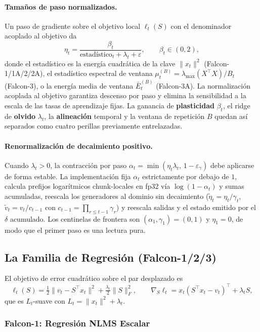 \paragraph{Tamaños de paso normalizados.} Un paso de gradiente sobre el objetivo local $\ell_t(S)$ con el denominador acoplado al objetivo da
\[
\eta_t = \frac{\beta_t}{\text{estadístico}_t + \lambda_t + \varepsilon}, \qquad \beta_t \in (0, 2),
\]
donde el estadístico es la energía cuadrática de la clave $\|x_t\|^2$ (Falcon-1/1A/2/2A), el estadístico espectral de ventana $\mu_t^{(B)} = \lambda_{\max}(X^\top X)/B_t$ (Falcon-3), o la energía media de ventana $\bar{E}_t^{(B)}$ (Falcon-3A). La normalización acoplada al objetivo garantiza descenso por paso y elimina la sensibilidad a la escala de las tasas de aprendizaje fijas. La ganancia de \textbf{plasticidad} $\beta_t$, el ridge de \textbf{olvido} $\lambda_t$, la \textbf{alineación} temporal y la ventana de repetición $B$ quedan así separados como cuatro perillas previamente entrelazadas.

\paragraph{Renormalización de decaimiento positivo.} Cuando $\lambda_t > 0$, la contracción por paso $\alpha_t = \min(\eta_t \lambda_t,\, 1 - \varepsilon_\gamma)$ debe aplicarse de forma estable. La implementación fija $\alpha_t$ estrictamente por debajo de $1$, calcula prefijos logarítmicos chunk-locales en fp32 vía $\log(1 - \alpha_t)$ y sumas acumuladas, reescala los generadores al dominio sin decaimiento ($\tilde{\eta}_t = \eta_t / \gamma_t$, $\tilde{v}_t = v_t / c_{t-1}$ con $c_{t-1} = \prod_{r \le t-1} \gamma_r$) y reescala salidas y el estado emitido por el $\delta$ acumulado. Los centinelas de frontera son $(\alpha_1, \gamma_1) = (0, 1)$ y $\eta_1 = 0$, de modo que el primer paso es una lectura pura.

\subsection{La Familia de Regresión (Falcon-1/2/3)}

El objetivo de error cuadrático sobre el par desplazado es
\[
\ell_t(S) = \tfrac{1}{2}\|v_t - S^\top x_t\|^2 + \tfrac{\lambda_t}{2}\|S\|_F^2,
\qquad
\nabla_S \ell_t = x_t (S^\top x_t - v_t)^\top + \lambda_t S,
\]
que es $L_t$-suave con $L_t = \|x_t\|^2 + \lambda_t$.

\subsubsection{Falcon-1: Regresión NLMS Escalar}

